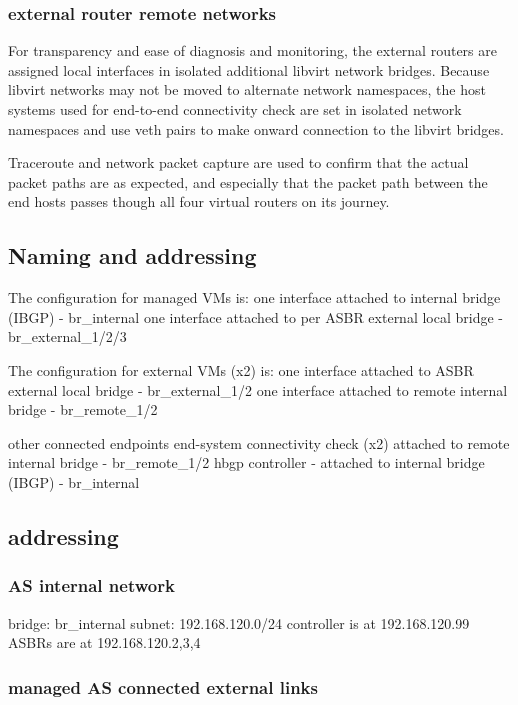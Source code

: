 \subsubsection{external router remote networks}
For transparency and ease of diagnosis and monitoring, the external routers are assigned local interfaces in isolated additional libvirt network bridges.  Because libvirt networks may not be moved to alternate network namespaces, the host systems used for end-to-end connectivity check are set in isolated network namespaces and use veth  pairs to make onward connection to the libvirt bridges.

Traceroute and network packet capture are used to confirm that the actual packet paths are as expected, and especially that the packet path between the end hosts passes though all four virtual routers on its journey.

\subsection{Naming and addressing}

The configuration for managed VMs is:
one interface attached to internal bridge (IBGP) - br\_internal
one interface attached to per ASBR external local bridge - br\_external\_1/2/3

The configuration for external VMs (x2) is:
one interface attached to ASBR external local bridge - br\_external\_1/2
one interface attached to remote internal bridge - br\_remote\_1/2

other connected endpoints
end-system connectivity check (x2) attached to remote internal bridge - br\_remote\_1/2
hbgp controller - attached to internal bridge (IBGP) - br\_internal


\subsection{addressing}

\subsubsection{AS internal network}
bridge: br\_internal
subnet: 192.168.120.0/24
controller is at 192.168.120.99
ASBRs are at 192.168.120.2,3,4

\subsubsection{managed AS connected external links}

